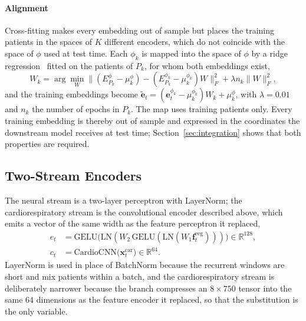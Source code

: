 \documentclass[a4paper,fleqn]{cas-sc}
\begin{document}
\paragraph{Alignment} Cross-fitting makes every embedding out of sample but places the
training patients in the spaces of $K$ different encoders, which do not coincide with the
space of $\phi$ used at test time. Each $\phi_k$ is mapped into the space of $\phi$ by a ridge
regression~\cite{hoerl1970ridge} fitted on the patients of $P_k$, for whom both embeddings
exist,
\begin{equation}
W_k=\arg\min_W\big\lVert(E^{\phi}_{P_k}-\mu^{\phi}_k)-(E^{\phi_k}_{P_k}-\mu^{\phi_k}_k)W\big\rVert_F^2
+\lambda n_k\lVert W\rVert_F^2,
\end{equation}
and the training embeddings become
$\tilde{\mathbf{e}}_t=(\mathbf{e}^{\phi_k}_t-\mu^{\phi_k}_k)W_k+\mu^{\phi}_k$, with $\lambda=0.01$
and $n_k$ the number of epochs in $P_k$. The map uses training patients only. Every training
embedding is thereby out of sample and expressed in the coordinates the downstream model
receives at test time; Section~\ref{sec:integration} shows that both properties are
required.

\subsection{Two-Stream Encoders}
The neural stream is a two-layer perceptron with LayerNorm; the cardiorespiratory stream is the convolutional encoder described above, which emits a vector of the same width as the feature perceptron it replaced,
\begin{align}
e_t&=\mathrm{GELU}\!\big(\mathrm{LN}(W_2\,\mathrm{GELU}(\mathrm{LN}(W_1\mathbf{f}^{\mathrm{eeg}}_t))) \big)\in\mathbb{R}^{128},\\
c_t&=\mathrm{CardioCNN}\big(\mathbf{x}^{\mathrm{car}}_t\big)\in\mathbb{R}^{64}.
\end{align}
LayerNorm is used in place of BatchNorm because the recurrent windows are short and mix patients within a batch, and the cardiorespiratory stream is deliberately narrower because the branch compresses an $8\times750$ tensor into the same $64$ dimensions as the feature encoder it replaced, so that the substitution is the only variable.
\end{document}
